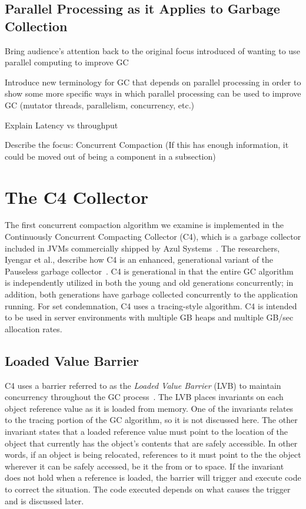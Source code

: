 \documentclass{sig-alternate}
\begin{document}
\subsection{Parallel Processing as it Applies to Garbage Collection}
\label{sec:parallelProcessingGarbageCollection}

Bring audience's attention back to the original focus introduced 
of wanting to use parallel computing to improve GC

Introduce new terminology for GC that depends on parallel processing 
in order to show some more specific ways in which parallel processing 
can be used to improve GC (mutator threads, parallelism, concurrency, etc.)

Explain Latency vs throughput

Describe the focus: Concurrent Compaction (If this has enough information, 
it could be moved out of being a component in a subsection)


\section{The C4 Collector}
\label{sec:c4}

The first concurrent compaction algorithm we examine is implemented in the 
Continuously Concurrent Compacting Collector (C4), which is a garbage collector 
included in JVMs commercially shipped by Azul Systems~\cite{Tene:C4}. The 
researchers, Iyengar et al., describe how C4 is an enhanced, generational variant
of the Pauseless garbage collector~\cite{Click:Pauseless}. C4 is generational in 
that the entire GC algorithm is independently utilized in both the young and old generations 
concurrently; in addition, both generations have garbage collected concurrently 
to the application running. For set condemnation, C4 uses a tracing-style algorithm.
C4 is intended to be used in server environments with multiple GB heaps and 
multiple GB/sec allocation rates.


\subsection{Loaded Value Barrier}
\label{sec:c4LVB}

C4 uses a barrier referred to as the \emph{Loaded Value Barrier} (LVB) to 
maintain concurrency throughout the GC process~\cite{Tene:C4}. The LVB 
places invariants on each object reference value as it is loaded from memory.
One of the invariants relates to the tracing portion of the GC algorithm, so
it is not discussed here. The other invariant states that a loaded
reference value must point to the location of the object that currently has the
object's contents that are safely accessible. 
In other words, if an object is being relocated, references to it must point 
to the the object wherever it can be safely accessed, be it the from or to 
space. If the invariant does not hold
when a reference is loaded, the barrier will trigger and execute code to correct
the situation. The code executed depends on what causes the trigger
and is discussed later.
\end{document}
